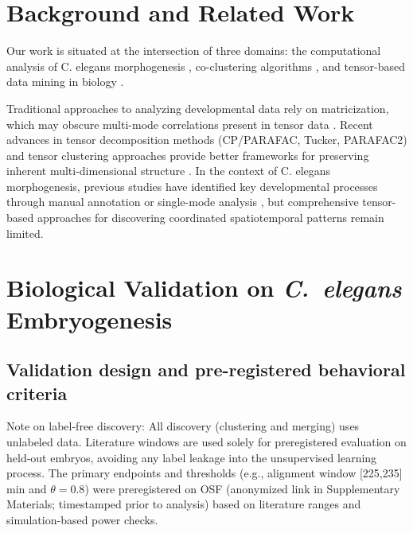\documentclass[unnumsec,webpdf,modern,large,namedate]{oup-authoring-template}%
\theoremstyle{thmstyleone}\newtheorem{theorem}{Theorem}
\theoremstyle{thmstyletwo}\newtheorem{example}{Example}
\theoremstyle{thmstylethree}\newtheorem{definition}{Definition}
\begin{document}
\section{Background and Related Work}

Our work is situated at the intersection of three domains: the computational analysis of C. elegans morphogenesis \citep{sulston1983EmbryonicCellLineage,bao2006AutomatedCellLineage,murray2008AutomatedAnalysisEmbryonic,chisholm2005epidermal,kaletta2006FindingFunctionNovel}, co-clustering algorithms \citep{hartigan1972DirectClusteringData,madeira2004BiclusteringAlgorithmsBiological,xie2019ItTimeApplya,hochreiter2010FABIAFactorAnalysis,orzechowski2018EBICEvolutionarybasedParallel,yi2021COBRACFastImplementation}, and tensor-based data mining in biology \citep{kolda2009TensorDecompositionsApplications,cichocki2015TensorDecompositionsSignal,sidiropoulos2017TensorDecompositionSignal,drakopoulos2019TensorClusteringReview,sun2008IncrementalTensorAnalysis,cheng2019TensorBasedLowDimensionalRepresentation}.

Traditional approaches to analyzing developmental data rely on matricization, which may obscure multi-mode correlations present in tensor data \citep{kolda2009TensorDecompositionsApplications,cichocki2015TensorDecompositionsSignal}. Recent advances in tensor decomposition methods (CP/PARAFAC, Tucker, PARAFAC2) and tensor clustering approaches provide better frameworks for preserving inherent multi-dimensional structure \citep{sidiropoulos2017TensorDecompositionSignal,drakopoulos2019TensorClusteringReview}. In the context of C. elegans morphogenesis, previous studies have identified key developmental processes through manual annotation or single-mode analysis \citep{sulston1983EmbryonicCellLineage,bao2006AutomatedCellLineage,murray2008AutomatedAnalysisEmbryonic,zhu2024TIAM1RegulatesPolarized}, but comprehensive tensor-based approaches for discovering coordinated spatiotemporal patterns remain limited.

\section{Biological Validation on \textit{C.~elegans} Embryogenesis}
\label{sec:celegans_validation}

\subsection{Validation design and pre-registered behavioral criteria}
Note on label-free discovery: All discovery (clustering and merging) uses unlabeled data. Literature windows are used solely for preregistered evaluation on held-out embryos, avoiding any label leakage into the unsupervised learning process. The primary endpoints and thresholds (e.g., alignment window [225,235] min and $\theta=0.8$) were preregistered on OSF (anonymized link in Supplementary Materials; timestamped prior to analysis) based on literature ranges and simulation-based power checks.
\end{document}
